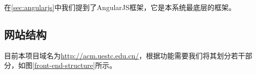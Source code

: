 在\ref{sec:angularjs}中我们提到了AngularJS框架，它是本系统最底层的框架。

\subsection{网站结构}

目前本项目域名为\url{http://acm.uestc.edu.cn/}，根据功能需要我们将其划分若干部分，如图\ref{front-end-structure}所示。